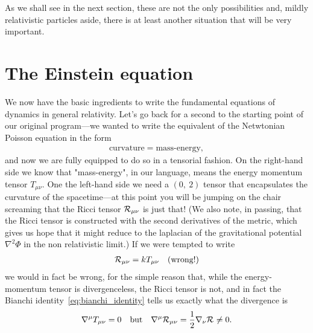 As we shall see in the next section, these are not the only possibilities and,
mildly relativistic particles aside, there is at least another situation that will
be very important.



\section{The Einstein equation}\label{sec:efe}

We now have the basic ingredients to write the fundamental equations of dynamics
in general relativity. Let's go back for a second to the starting point of our original
program---we wanted to write the equivalent of the Netwtonian Poisson equation in the
form
\begin{align*}
  \text{curvature} = \text{mass-energy},
\end{align*}
and now we are fully equipped to do so in a tensorial fashion. On the right-hand
side we know that "mass-energy", in our language, means the energy momentum tensor
$T_{\mu\nu}$.
One the left-hand side we need a $(0,~2)$ tensor that encapsulates the curvature of
the spacetime---at this point you will be jumping on the chair screaming that the
Ricci tensor $\mathcal{R}_{\mu\nu}$ is just that! (We also note, in passing, that the
Ricci tensor is constructed with the second derivatives of the metric, which gives
us hope that it might reduce to the laplacian of the gravitational potential
$\nabla^2\Phi$ in the non relativistic limit.) If we were tempted to write
\begin{align*}
  \mathcal{R}_{\mu\nu} = k T_{\mu\nu} \quad\text{(wrong!)}
\end{align*}
we would in fact be wrong, for the simple reason that, while the energy-momentum
tensor is divergenceless, the Ricci tensor is not, and in fact the Bianchi identity~\eqref{eq:bianchi_identity}
tells us exactly what the divergence is
\begin{align*}
  \nabla^\mu T_{\mu\nu} = 0 \quad\text{but}\quad
  \nabla^\mu\mathcal{R}_{\mu\nu} = \frac{1}{2}\nabla_\nu \mathcal{R}_{} \neq 0.
\end{align*}


